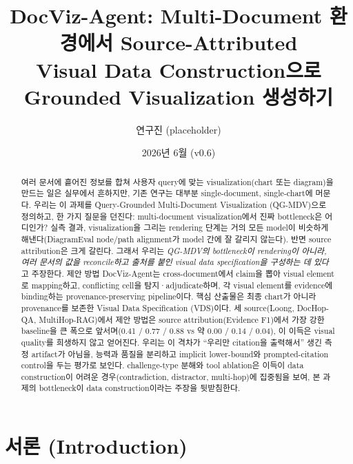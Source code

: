 \documentclass[11pt]{article}
\title{DocViz-Agent: Multi-Document 환경에서 Source-Attributed \\
       Visual Data Construction으로 Grounded Visualization 생성하기}
\author{연구진 (placeholder)}
\date{2026년 6월 (v0.6)}
\begin{document}
\maketitle

\begin{abstract}
여러 문서에 흩어진 정보를 합쳐 사용자 query에 맞는 visualization(chart 또는 diagram)을 만드는
일은 실무에서 흔하지만, 기존 연구는 대부분 single-document, single-chart에 머문다. 우리는 이
과제를 Query-Grounded Multi-Document Visualization (QG-MDV)으로 정의하고, 한 가지 질문을 던진다:
multi-document visualization에서 진짜 bottleneck은 어디인가? 실측 결과, visualization을 그리는
rendering 단계는 거의 모든 model이 비슷하게 해낸다(DiagramEval node/path alignment가 model 간에
잘 갈리지 않는다). 반면 source attribution은 크게 갈린다. 그래서 우리는 \emph{QG-MDV의 bottleneck이
rendering이 아니라, 여러 문서의 값을 reconcile하고 출처를 붙인 visual data specification을 구성하는
데 있다}고 주장한다. 제안 방법 DocViz-Agent는 cross-document에서 claim을 뽑아 visual element로
mapping하고, conflicting cell을 탐지·adjudicate하며, 각 visual element를 evidence에 binding하는
provenance-preserving pipeline이다. 핵심 산출물은 최종 chart가 아니라 provenance를 보존한 Visual
Data Specification (VDS)이다. 세 source(Loong, DocHop-QA, MultiHop-RAG)에서 제안 방법은 source
attribution(Evidence F1)에서 가장 강한 baseline을 큰 폭으로 앞서며(0.41 / 0.77 / 0.88 vs 약
0.00 / 0.14 / 0.04), 이 이득은 visual quality를 희생하지 않고 얻어진다. 우리는 이 격차가 ``우리만
citation을 출력해서'' 생긴 측정 artifact가 아님을, 능력과 품질을 분리하고 implicit lower-bound와
prompted-citation control을 두는 평가로 보인다. challenge-type 분해와 tool ablation은 이득이
data construction이 어려운 경우(contradiction, distractor, multi-hop)에 집중됨을 보여, 본 과제의
bottleneck이 data construction이라는 주장을 뒷받침한다.
\end{abstract}

\begin{center}
\end{center}

\section{서론 (Introduction)}
\end{document}
